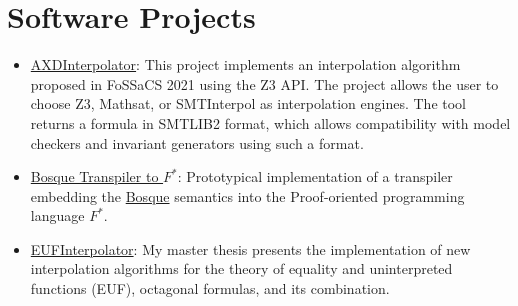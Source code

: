 \section{Software Projects}


\begin{itemize}
\item \href{https://github.com/typesAreSpaces/AXDInterpolator}{AXDInterpolator}:
  This project implements an interpolation algorithm proposed in FoSSaCS 2021 %
  using the Z3 API. %
  The project allows the user to choose Z3, Mathsat, or SMTInterpol as
  interpolation engines. The tool returns a formula in SMTLIB2 format, which
  allows compatibility with model checkers and invariant generators using such a
  format.
\item
  \href{https://github.com/typesAreSpaces/BosqueLanguage/tree/fstar-implementation/ref_impl}{Bosque
    Transpiler to $F^{*}$}: Prototypical implementation of a transpiler
    embedding the
    \href{https://www.microsoft.com/en-us/research/project/bosque-programming-language/}{Bosque}
    semantics into the Proof-oriented programming language
    \href{https://www.fstar-lang.org/}{$F^{*}$}.
\item \href{https://github.com/typesAreSpaces/EUFInterpolator}{EUFInterpolator}:
  My master thesis presents the implementation of new interpolation algorithms
  for the theory of equality and uninterpreted functions (EUF), octagonal
  formulas, and its combination.
\end{itemize}
